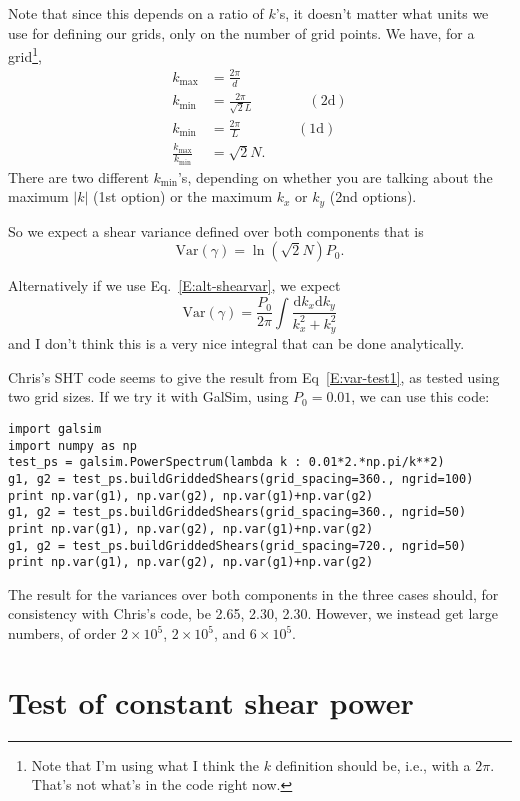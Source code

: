 \documentclass[preprint]{aastex}
\newcommand{\kmax}{\ensuremath{k_\mathrm{max}}}
\newcommand{\kmin}{\ensuremath{k_\mathrm{min}}}
\newcommand{\rmd}{\ensuremath{\mathrm{d}}}
\newcommand{\beq}{\begin{equation}}
\newcommand{\eeq}{\end{equation}}
\begin{document}
Note that since this depends on a ratio of $k$'s, it doesn't matter
what units we use for defining our grids, only on the number of grid
points.  We have, for a grid\footnote{Note that I'm using what I think
  the $k$ definition should be, i.e., with a $2\pi$.  That's not
  what's in the code right now.},
\begin{align}
\kmax &= \frac{2\pi}{d} \\
\kmin &= \frac{2\pi}{\sqrt{2}L} \qquad\qquad\mathrm{(2d)}\label{E:kmin2d}\\
\kmin &= \frac{2\pi}{L}  \qquad\qquad\mathrm{ (1d)}\label{E:kmin1d}\\
\frac{\kmax}{\kmin} &= \sqrt{2}N.
\end{align}
There are two different \kmin's, depending on whether you are talking
about the maximum $|k|$ (1st option) or the maximum $k_x$ or $k_y$
(2nd options).

So we expect a shear variance defined over both components that is
\beq\label{E:var-test1}
\mathrm{Var}(\gamma) = \ln{(\sqrt{2}N)} P_0.
\eeq

Alternatively if we use Eq.~\ref{E:alt-shearvar}, we expect
\beq
\mathrm{Var}(\gamma) = \frac{P_0}{2\pi} \int \frac{\rmd k_x \rmd k_y}{k_x^2+k_y^2}
\eeq
and I don't think this is a very nice integral that can be done
analytically. 

Chris's SHT code seems to give the result from Eq~\ref{E:var-test1}, as tested using
two grid sizes.  If we try it with GalSim, using $P_0=0.01$, we can
use this code:
\begin{verbatim}
import galsim
import numpy as np
test_ps = galsim.PowerSpectrum(lambda k : 0.01*2.*np.pi/k**2)
g1, g2 = test_ps.buildGriddedShears(grid_spacing=360., ngrid=100)
print np.var(g1), np.var(g2), np.var(g1)+np.var(g2)
g1, g2 = test_ps.buildGriddedShears(grid_spacing=360., ngrid=50)
print np.var(g1), np.var(g2), np.var(g1)+np.var(g2)
g1, g2 = test_ps.buildGriddedShears(grid_spacing=720., ngrid=50)
print np.var(g1), np.var(g2), np.var(g1)+np.var(g2)
\end{verbatim}

The result for the variances over both components in the three cases
should, for consistency with Chris's code, be 2.65, 2.30, 2.30.
However, we instead get large numbers, of order $2\times 10^5$,
$2\times 10^5$, and $6\times 10^5$.

\section{Test of constant shear power}
\end{document}
